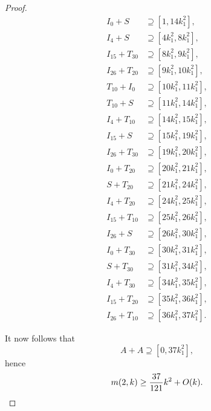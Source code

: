 \begin{proof}
\begin{align*}
I_0 + S &\supseteq [1, 14k_1^2],\\
I_4 + S &\supseteq [4k_1^2, 8k_1^2],\\
I_{15} + T_{30}  &\supseteq [8k_1^2, 9k_1^2],\\
I_{26} + T_{20}  &\supseteq [9k_1^2, 10k_1^2],\\
T_{10} + I_{0}  &\supseteq [10k_1^2, 11k_1^2],\\
T_{10} + S  &\supseteq [11k_1^2, 14k_1^2],\\
I_{4} + T_{10}  &\supseteq [14k_1^2, 15k_1^2],\\
I_{15} + S  &\supseteq [15k_1^2, 19k_1^2],\\
I_{26} + T_{30}  &\supseteq [19k_1^2, 20k_1^2],\\
I_{0} + T_{20}  &\supseteq [20k_1^2, 21k_1^2],\\
S + T_{20}  &\supseteq [21k_1^2, 24k_1^2],\\
I_{4} + T_{20}  &\supseteq [24k_1^2, 25k_1^2],\\
I_{15} + T_{10}  &\supseteq [25k_1^2, 26k_1^2],\\
I_{26} + S  &\supseteq [26k_1^2, 30k_1^2],\\
I_{0} + T_{30}  &\supseteq [30k_1^2, 31k_1^2],\\
S + T_{30}  &\supseteq [31k_1^2, 34k_1^2],\\
I_{4} + T_{30}  &\supseteq [34k_1^2, 35k_1^2],\\
I_{15} + T_{20}  &\supseteq [35k_1^2, 36k_1^2], \\
I_{26} + T_{10}  &\supseteq [36k_1^2, 37k_1^2].
\end{align*}

It now follows that 
\[
A + A \supseteq [0, 37k_1^2],
\]
hence
\[
m(2,k) \geq \frac{37}{121}k^2 + O(k). \qedhere
\]
\end{proof}
